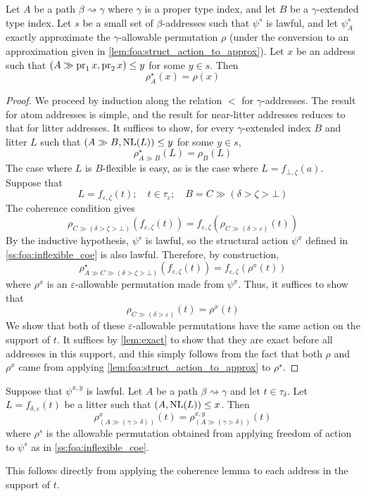 \begin{lemma}
    \label{lem:coherence}
    Let \( A \) be a path \( \beta \rightsquigarrow \gamma \) where \( \gamma \) is a proper type index, and let \( B \) be a \( \gamma \)-extended type index.
    Let \( s \) be a small set of \( \beta \)-addresses such that \( \psi^s \) is lawful, and let \( \psi^s_A \) exactly approximate the \( \gamma \)-allowable permutation \( \rho \) (under the conversion to an approximation given in \cref{lem:foa:struct_action_to_approx}).
    Let \( x \) be an address such that \( (A \gg \operatorname{pr}_1 x, \operatorname{pr}_2 x) \leq y \) for some \( y \in s \).
    Then
    \[ \rho^\star_A(x) = \rho(x) \]
\end{lemma}
\begin{proof}
    We proceed by induction along the relation \( < \) for \( \gamma \)-addresses.
    The result for atom addresses is simple, and the result for near-litter addresses reduces to that for litter addresses.
    It suffices to show, for every \( \gamma \)-extended index \( B \) and litter \( L \) such that \( (A \gg B, \operatorname{NL}(L)) \leq y \) for some \( y \in s \),
    \[ \rho^\star_{A \gg B}(L) = \rho_B(L) \]
    The case where \( L \) is \( B \)-flexible is easy, as is the case where \( L = f_{\bot,\zeta}(a) \).
    Suppose that
    \[ L = f_{\varepsilon,\zeta}(t);\quad t \in \tau_\varepsilon;\quad B = C \gg (\delta > \zeta > \bot) \]
    The coherence condition gives
    \[ \rho_{C \gg (\delta > \zeta > \bot)}(f_{\varepsilon,\zeta}(t)) = f_{\varepsilon,\zeta}(\rho_{C \gg (\delta > \varepsilon)}(t)) \]
    By the inductive hypothesis, \( \psi^s \) is lawful, so the structural action \( \psi^x \) defined in \cref{ss:foa:inflexible_coe} is also lawful.
    Therefore, by construction,
    \[ \rho^\star_{A \gg C \gg (\delta > \zeta > \bot)}(f_{\varepsilon,\zeta}(t)) = f_{\varepsilon,\zeta}(\rho^x(t)) \]
    where \( \rho^x \) is an \( \varepsilon \)-allowable permutation made from \( \psi^x \).
    Thus, it suffices to show that
    \[ \rho_{C \gg (\delta > \varepsilon)}(t) = \rho^x(t) \]
    We show that both of these \( \varepsilon \)-allowable permutations have the same action on the support of \( t \).
    It suffices by \cref{lem:exact} to show that they are exact before all addresses in this support, and this simply follows from the fact that both \( \rho \) and \( \rho^x \) came from applying \cref{lem:foa:struct_action_to_approx} to \( \rho^\star \).
\end{proof}

\begin{corollary}
    \label{cor:foa_both}
    Suppose that \( \psi^{x,y} \) is lawful.
    Let \( A \) be a path \( \beta \rightsquigarrow \gamma \) and let \( t \in \tau_\delta \).
    Let \( L = f_{\delta,\varepsilon}(t) \) be a litter such that \( (A, \operatorname{NL}(L)) \leq x \).
    Then
    \[ \rho^x_{(A \gg (\gamma > \delta))}(t) = \rho^{x,y}_{(A \gg (\gamma > \delta))}(t) \]
    where \( \rho^s \) is the allowable permutation obtained from applying freedom of action to \( \psi^s \) as in \cref{ss:foa:inflexible_coe}.
\end{corollary}
This follows directly from applying the coherence lemma to each address in the support of \( t \).

